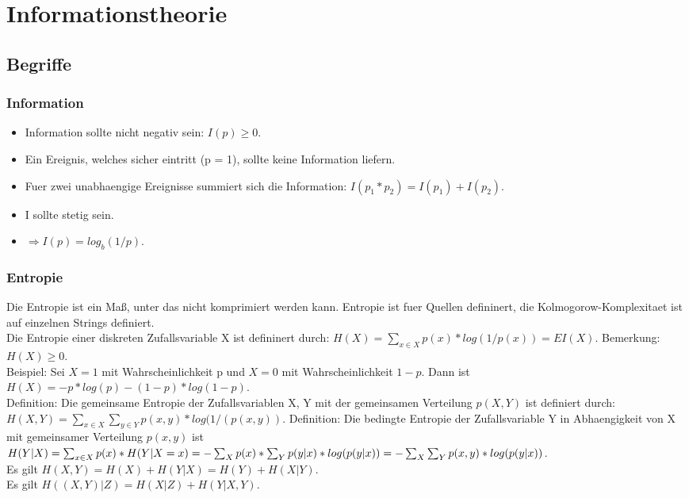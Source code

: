 \documentclass[a4paper]{scrreprt}
\begin{document}
\chapter{Informationstheorie}

\section{Begriffe}

\subsection{Information}
\begin{itemize}
	\item Information sollte nicht negativ sein: $I(p) \ge 0$.
	\item Ein Ereignis, welches sicher eintritt (p = 1), sollte keine Information liefern.
	\item Fuer zwei unabhaengige Ereignisse summiert sich die Information: $I(p_1*p_2) = I(p_1) + I(p_2)$.
	\item I sollte stetig sein.
	\item $\Rightarrow I(p) = log_b(1/p)$.
\end{itemize}

\subsection{Entropie}
Die Entropie ist ein Maß, unter das nicht komprimiert werden kann. Entropie ist fuer Quellen defininert, die Kolmogorow-Komplexitaet ist auf einzelnen Strings definiert.\\
Die Entropie einer diskreten Zufallsvariable X ist defininert durch: $H(X) = \sum_{x \in X}p(x)*log(1/p(x)) = EI(X)$.
Bemerkung: $H(X) \ge 0$.\\
Beispiel: Sei $X=1$ mit Wahrscheinlichkeit p und $X=0$ mit Wahrscheinlichkeit $1-p$. Dann ist $H(X) = -p*log(p) - (1-p)*log(1-p)$.\\
Definition: Die gemeinsame Entropie der Zufallsvariablen X, Y mit der gemeinsamen Verteilung $p(X,Y)$ ist definiert durch: $H(X,Y) = \sum_{x \in X}\sum_{y \in Y}p(x,y)*log(1/(p(x,y))$.
Definition: Die bedingte Entropie der Zufallsvariable Y in Abhaengigkeit von X mit gemeinsamer Verteilung $p(x,y)$ ist\\
$H(Y|X) = \sum_{x \in X}p(x)*H(Y|X = x)\\
= -\sum_X p(x)*\sum_Y p(y|x)*log(p(y|x))\\
= -\sum_X \sum_Y p(x,y)*log(p(y|x))$.\\
Es gilt $H(X,Y) = H(X) + H(Y|X) = H(Y) + H(X|Y)$.\\
Es gilt $H((X,Y)|Z) = H(X|Z) + H(Y|X,Y)$.
\end{document}
